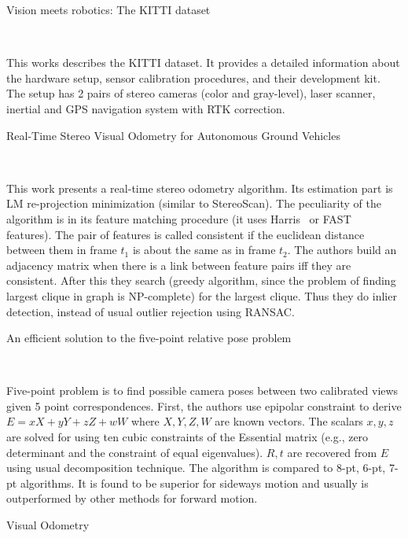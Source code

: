 \documentclass[10pt]{article}         %
\begin{document}
\begin{enumerate}
  {\Large \item Vision meets
    robotics: The KITTI dataset}~\cite{geiger2013vision}

  This works describes the KITTI dataset. It provides a detailed
  information about the hardware setup, sensor calibration procedures,
  and their development kit.  The setup has 2 pairs of stereo cameras
  (color and gray-level), laser scanner, inertial and GPS navigation
  system with RTK correction.

  {\Large \item Real-Time Stereo Visual Odometry for Autonomous Ground
    Vehicles}~\cite{howard2008real}

  This work presents a real-time stereo odometry algorithm.  Its
  estimation part is LM re-projection minimization (similar to
  StereoScan).  The peculiarity of the algorithm is in its feature
  matching procedure (it uses Harris~\cite{harris1988combined} or
  FAST~\cite{rosten2006machine} features).  The pair of features is
  called consistent if the euclidean distance between them in frame
  $t_1$ is about the same as in frame $t_2$.  The authors build an
  adjacency matrix when there is a link between feature pairs iff they
  are consistent.  After this they search (greedy algorithm, since the
  problem of finding largest clique in graph is NP-complete) for the
  largest clique.  Thus they do inlier detection, instead of usual
  outlier rejection using RANSAC.

  {\Large \item An efficient solution to the five-point relative pose
    problem}~\cite{nister2004efficient}

  Five-point problem is to find possible camera poses between two
  calibrated views given 5 point correspondences. First, the authors
  use epipolar constraint to derive $E = xX+yY+zZ+wW$ where $X,Y,Z,W$
  are known vectors.  The scalars $x,y,z$ are solved for using ten
  cubic constraints of the Essential matrix (e.g., zero determinant and
  the constraint of equal eigenvalues). $R,t$ are recovered from $E$
  using usual decomposition technique.  The algorithm is compared to
  8-pt, 6-pt, 7-pt algorithms.  It is found to be superior for
  sideways motion and usually is outperformed by other methods for
  forward motion.

  {\Large \item Visual Odometry}~\cite{nister2004visual}


\end{enumerate}
\end{document}

